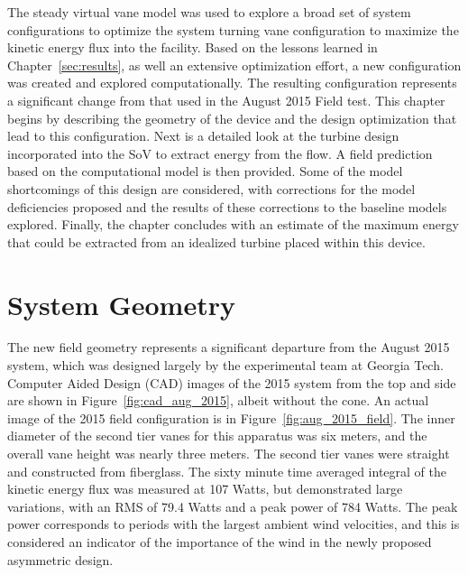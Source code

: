 \label{sec:field}

The steady virtual vane model was used to explore a broad set of
system configurations to optimize the system turning vane
configuration to maximize the kinetic energy flux into the facility. 
Based on the lessons learned in Chapter~\ref{sec:results}, as
well an extensive optimization effort, a new configuration was created
and explored computationally. The resulting configuration represents a
significant change from that used in the August 2015 Field test. This
chapter begins by describing the geometry of the device and the design
optimization that lead to this configuration. Next is a detailed look
at the turbine design incorporated into the SoV to extract energy from
the flow. A field prediction based on the computational model is
then provided. Some of the model shortcomings of this design are
considered, with corrections for the model deficiencies proposed and the
results of these corrections to the baseline models explored. Finally,
the chapter concludes with an estimate of the maximum energy that could
be extracted from an idealized turbine placed within this device.   

\section{System Geometry}

The new field geometry represents a significant departure from
the August 2015 system, which was designed largely by the experimental
team at Georgia Tech. Computer Aided Design (CAD) images of the 2015
system from the top and side are shown in Figure~\ref{fig:cad_aug_2015},
albeit without the cone. An actual image of the 2015 field configuration
is in Figure~\ref{fig:aug_2015_field}. The inner diameter of the second
tier vanes for this apparatus was six meters, and the overall vane
height was nearly three meters. The second tier vanes were straight and
constructed from fiberglass. The sixty minute time averaged integral
of the kinetic energy flux was measured at 107 Watts, but demonstrated
large variations, with an RMS of 79.4 Watts and a peak power of 784
Watts. The peak power corresponds to periods with the largest ambient
wind velocities, and this is considered an indicator of the 
importance of the wind in the newly proposed asymmetric design.  

%
%
% 


